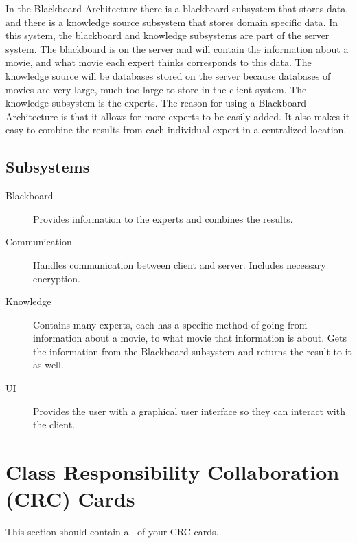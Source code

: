 \documentclass[]{article}
\begin{document}
In the Blackboard Architecture there is a blackboard subsystem that stores data, and there is a knowledge source subsystem that stores domain specific data. In this system, the blackboard and knowledge subsystems are part of the server system. The blackboard is on the server and will contain the information about a movie, and what movie each expert thinks corresponds to this data. The knowledge source will be databases stored on the server because databases of movies are very large, much too large to store in the client system. The knowledge subsystem is the experts. The reason for using a Blackboard Architecture is that it allows for more experts to be easily added. It also makes it easy to combine the results from each individual expert in a centralized location.

\subsection{Subsystems}
\label{sub:subsystems}
\begin{description}
	\item[Blackboard] Provides information to the experts and combines the results.
	\item[Communication] Handles communication between client and server. Includes necessary encryption.
	\item[Knowledge] Contains many experts, each has a specific method of going from information about a movie, to what movie that information is about. Gets the information from the Blackboard subsystem and returns the result to it as well.
	\item[UI] Provides the user with a graphical user interface so they can interact with the client.
\end{description}

	
\section{Class Responsibility Collaboration (CRC) Cards}
\label{sec:class_responsibility_collaboration_crc_cards}
This section should contain all of your CRC cards.
\end{document}
